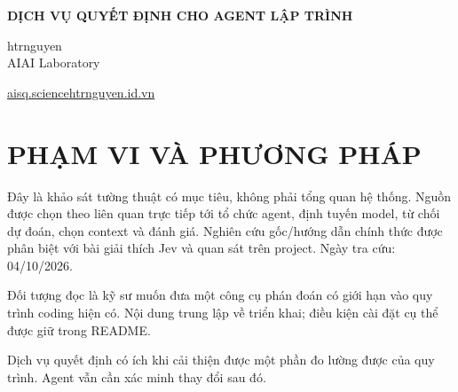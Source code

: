 \documentclass[10pt,a4paper]{article}
\begin{document}
\thispagestyle{firstpage}
\begin{center}
{\Large\bfseries DỊCH VỤ QUYẾT ĐỊNH CHO AGENT LẬP TRÌNH\par}
\vspace{8pt}
htrnguyen\\AIAI Laboratory\par
\vspace{4pt}
\href{https://aisq.science/}{aisq.science}\quad\href{https://www.htrnguyen.id.vn/}{htrnguyen.id.vn}\par
\end{center}
\begin{abstract}
Agent lập trình có thể sinh kế hoạch và bản sửa, nhưng nhiều lựa chọn xung quanh chỉ có một tập đáp án nhỏ, rõ ràng. Báo cáo khảo sát khi nào nên tách những lựa chọn đó thành dịch vụ quyết định, khi nào nên dùng code xác định và cách đưa sự không chắc chắn vào quy trình. Từ nghiên cứu và hướng dẫn kỹ thuật được chọn, báo cáo giới thiệu Laya MCP Server như một triển khai giúp nhiều agent truy cập quyết định có giới hạn qua giao diện chung. Nội dung gồm khung chọn tác vụ, hợp đồng tích hợp, phương pháp làm việc tái lập và phép quan sát nhỏ có cả ca đúng lẫn sai. Báo cáo không khẳng định có huấn luyện model mới, benchmark tổng quát, chất lượng ngang Jev hay chắc chắn tăng năng suất.
\end{abstract}
\section{PHẠM VI VÀ PHƯƠNG PHÁP}
Đây là khảo sát tường thuật có mục tiêu, không phải tổng quan hệ thống. Nguồn được chọn theo liên quan trực tiếp tới tổ chức agent, định tuyến model, từ chối dự đoán, chọn context và đánh giá. Nghiên cứu gốc/hướng dẫn chính thức được phân biệt với bài giải thích Jev và quan sát trên project. Ngày tra cứu: 04/10/2026.

Đối tượng đọc là kỹ sư muốn đưa một công cụ phán đoán có giới hạn vào quy trình coding hiện có. Nội dung trung lập về triển khai; điều kiện cài đặt cụ thể được giữ trong README.

Dịch vụ quyết định có ích khi cải thiện được một phần đo lường được của quy trình. Agent vẫn cần xác minh thay đổi sau đó.
\end{document}
